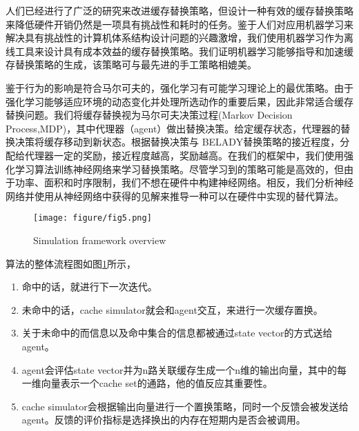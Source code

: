 \documentclass[10pt,journal,compsoc]{IEEEtran}
\begin{document}
人们已经进行了广泛的研究来改进缓存替换策略，但设计一种有效的缓存替换策略来降低硬件开销仍然是一项具有挑战性和耗时的任务。鉴于人们对应用机器学习来解决具有挑战性的计算机体系结构设计问题的兴趣激增，我们使用机器学习作为离线工具来设计具有成本效益的缓存替换策略。我们证明机器学习能够指导和加速缓存替换策略的生成，该策略可与最先进的手工策略相媲美。


鉴于行为的影响是符合马尔可夫的，强化学习有可能学习理论上的最优策略。由于强化学习能够适应环境的动态变化并处理所选动作的重要后果，因此非常适合缓存替换问题。我们将缓存替换视为马尔可夫决策过程(Markov Decision Process,MDP)，其中代理器（agent）做出替换决策。给定缓存状态，代理器的替换决策将缓存移动到新状态。根据替换决策与 BELADY替换策略的接近程度，分配给代理器一定的奖励，接近程度越高，奖励越高。在我们的框架中，我们使用强化学习算法训练神经网络来学习替换策略。尽管学习到的策略可能是高效的，但由于功率、面积和时序限制，我们不想在硬件中构建神经网络。相反，我们分析神经网络并使用从神经网络中获得的见解来推导一种可以在硬件中实现的替代算法。


\begin{figure}[!t]
\centering
\texttt{[image: figure/fig5.png]}
\caption{Simulation framework overview}
\label{fig_5}
\end{figure}

算法的整体流程图如图\ref{fig_5}所示，
\begin{enumerate}
\item 命中的话，就进行下一次迭代。
\item 未命中的话，cache simulator就会和agent交互，来进行一次缓存置换。
\item 关于未命中的而信息以及命中集合的信息都被通过state vector的方式送给agent。
\item agent会评估state vector并为n路关联缓存生成一个n维的输出向量，其中的每一维向量表示一个cache set的通路，他的值反应其重要性。
\item cache simulator会根据输出向量进行一个置换策略，同时一个反馈会被发送给agent。反馈的评价指标是选择换出的内存在短期内是否会被调用。

\end{enumerate}
\end{document}
